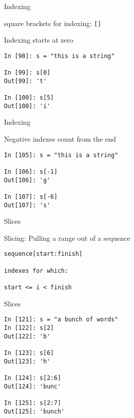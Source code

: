 \documentclass{beamer}
\begin{document}
\begin{frame}[fragile]{Indexing}

{\Large square brackets for indexing: \verb+[]+}

\vfill
{\Large Indexing starts at zero}

\begin{verbatim}
In [98]: s = "this is a string"

In [99]: s[0]
Out[99]: 't'

In [100]: s[5]
Out[100]: 'i'
\end{verbatim}

\end{frame}

\begin{frame}[fragile]{Indexing}

{\Large Negative indexes count from the end}

\vfill
\begin{verbatim}
In [105]: s = "this is a string"

In [106]: s[-1]
Out[106]: 'g'

In [107]: s[-6]
Out[107]: 's'
\end{verbatim}

\end{frame}

\begin{frame}[fragile]{Slices}

{\Large Slicing: Pulling a range out of a sequence}

\begin{verbatim}
sequence[start:finish]  

indexes for which:

start <= i < finish
\end{verbatim}

\end{frame}

\begin{frame}[fragile]{Slices}
\begin{verbatim}
In [121]: s = "a bunch of words"
In [122]: s[2]
Out[122]: 'b'

In [123]: s[6]
Out[123]: 'h'

In [124]: s[2:6]
Out[124]: 'bunc'

In [125]: s[2:7]
Out[125]: 'bunch'
\end{verbatim}

\end{frame}
\end{document}
